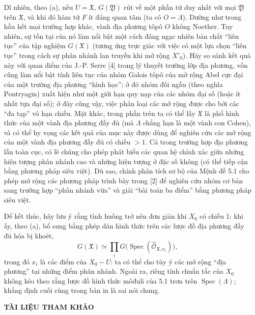 \documentclass[11pt,twoside,openany]{book}
\numberwithin{equation}{section}
\newcommand{\src}[1]{%
  \phantomsection\hypertarget{src:\fgasourceid:#1}{}%
  \marginpar{\raggedleft\footnotesize\sffamily #1}%
}
\newcommand{\fgasourceid}{unset}
\begin{document}
Dĩ nhiên, theo (a), nếu $U=\mathfrak X$, $G(\mathfrak Y)$ rút về một phần tử
duy nhất với mọi $\mathfrak Y$ trên $\mathfrak X$, và khi đó hàm tử $F$ ít
đáng quan tâm (ta có $O=\Lambda$). Dường như trong hầu hết mọi trường hợp khác,
vành địa phương tôpô $O$ không Noether. Tuy nhiên, sự tồn tại của nó làm nổi
bật một cách đáng ngạc nhiên bản chất ``liên tục'' của tập nghiệm
$G(\mathfrak X)$ (tương ứng trực giác với việc có một lựa chọn ``liên tục''
trong cách sự phân nhánh lan truyền khi mở rộng $X'_0$). Hãy so sánh kết quả
này với quan điểm của J.-P. Serre [4] trong lý thuyết trường lớp địa phương,
vốn cũng làm nổi bật tính liên tục của nhóm Galois tôpô của mở rộng Abel cực
đại của một trường địa phương ``hình học''; ở đó nhóm đối ngẫu (theo nghĩa
Pontryagin) xuất hiện như một giới hạn quy nạp của các nhóm đại số (hoặc ít
nhất tựa đại số); ở đây cũng vậy, việc phân loại các mở rộng được cho bởi các
``đa tạp'' vô hạn chiều. Mặt khác, trong phần trên ta có thể lấy
$\mathfrak X$ là phổ hình thức của một vành địa phương đầy đủ (mà $\Lambda$
chẳng hạn là một vành con Cohen), và có thể hy vọng các kết quả của mục này
được dùng để nghiên cứu các mở rộng của một vành địa phương đầy đủ có chiều
$>1$. Cả trong trường hợp địa phương lẫn toàn cục, có lẽ chúng cho phép phát
biểu các quan hệ chính xác giữa những hiện tượng phân nhánh cao và những hiện
tượng ở đặc số không (có thể tiếp cận bằng phương pháp siêu việt). Dù sao,
chính phân tích sơ bộ của Mệnh đề 5.1 cho phép mở rộng các phương pháp trình
bày trong [2] để nghiên cứu nhóm cơ bản sang trường hợp ``phân nhánh vừa'' và
giải ``bài toán ba điểm'' bằng phương pháp siêu việt.

Để kết thúc, hãy lưu ý rằng tình huống trở nên đơn giản khi $X_0$ có chiều 1:
khi ấy, theo (a), bổ sung bằng phép dán hình thức trên các lược đồ địa phương
đầy đủ hóa bị khoét,
\[
  G(\mathfrak X)\simeq
  \prod_iG\bigl(\operatorname{Spec}(\widehat{\mathcal O}_{\mathfrak X,x_i})\bigr),
\]
trong đó $x_i$ là các điểm của $X_0-U$: ta có thể cho tùy ý các mở rộng ``địa
phương'' tại những điểm phân nhánh. Ngoài ra, riêng tính chuẩn tắc của $X_0$
không kéo theo rằng lược đồ hình thức môđuli của 5.1 trơn trên
$\operatorname{Spec}(\Lambda)$; khẳng định cuối cùng trong bản in là sai nói
chung.

\src{390}
\begin{center}
  \textbf{TÀI LIỆU THAM KHẢO}
\end{center}
\end{document}
